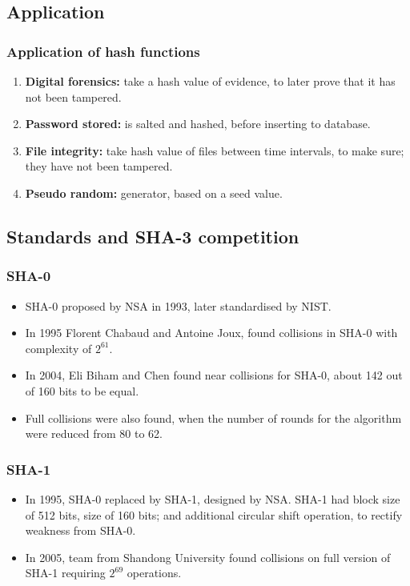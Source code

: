 \documentclass{beamer}
\begin{document}
\subsection{Application}
\begin{frame}
\frametitle{Application of hash functions}
\begin{enumerate}
\item {\bf Digital forensics:} take a hash value of evidence, to later prove that it has not been tampered.
\footnotemark
\item {\bf Password stored:} is salted and hashed, before inserting to database.
\item {\bf File integrity:} take hash value of files between time intervals, to make sure; they have not
been tampered.
\item {\bf Pseudo random:} generator, based on a seed value.
\end{enumerate}
\end{frame}

\subsection{Standards and SHA-3 competition}

\begin{frame}
\frametitle{SHA-0}
\begin{itemize}
\item SHA-0 proposed by NSA in 1993, later standardised by NIST. 
\item In 1995 Florent Chabaud and Antoine Joux, found collisions in SHA-0 with complexity of $2^{61}$.
\item In 2004, Eli Biham and Chen found near collisions for SHA-0, about 142 out of 160 bits to be equal.
\item Full collisions were also found, when the number of rounds for the algorithm were reduced from 80 to 62.
\end{itemize}
\end{frame}

\begin{frame}
\frametitle{SHA-1}
\begin{itemize}
\item In 1995, SHA-0 replaced by SHA-1, designed by NSA\footnotemark. SHA-1 had block size of 512 bits, size of 
160 bits; and additional circular shift operation, to rectify weakness from SHA-0.
\item In 2005, team from Shandong University found collisions on full version of SHA-1 requiring $2^{69}$ 
operations\footnotemark.
\end{itemize}
\end{frame}
\end{document}
